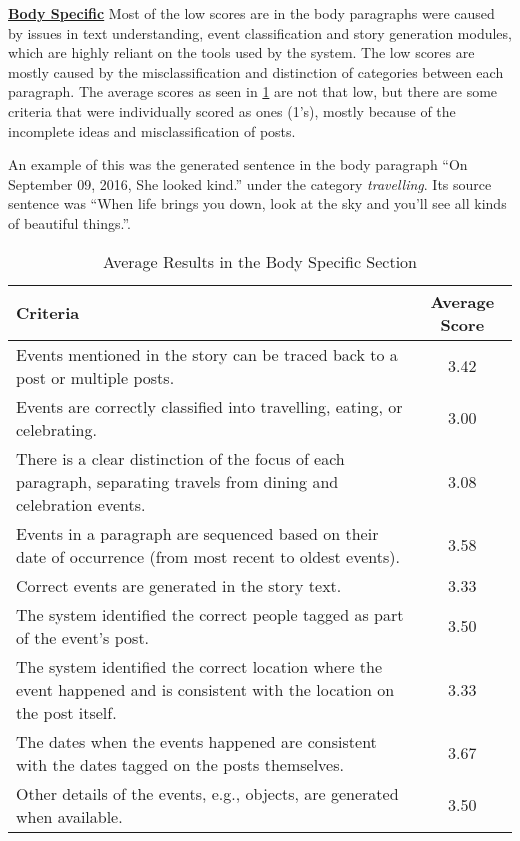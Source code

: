 \clearpage
\underline{\textbf{Body Specific}}
Most of the low scores are in the body paragraphs were caused by issues in text understanding, event classification and story generation modules, which are highly reliant on the tools used by the system. The low scores are mostly caused by the misclassification and distinction of categories between each paragraph. The average scores as seen in \ref{tab:criteria3} are not that low, but there are some criteria that were individually scored as ones (1's), mostly because of the incomplete ideas and misclassification of posts. 

An example of this was the generated sentence in the body paragraph ``On September 09, 2016, She looked kind.'' under the category \textit{travelling}. Its source sentence was ``When life brings you down, look at the sky and you'll see all kinds of beautiful things.''.

\begin{table}[ph!]   %
	\centering
	\caption{Average Results in the Body Specific Section} \vspace{0.25em}
	\begin{tabular}{|p{2.5in}|c|} \hline
		\centering Criteria & Average Score \\ \hline
		Events mentioned in the story can be traced back to a post or multiple posts. & 3.42 \\ \hline
		Events are correctly classified into travelling, eating, or celebrating. & 3.00 \\ \hline
		There is a clear distinction of the focus of each paragraph, separating travels from dining and celebration events. & 3.08 \\ \hline
		Events in a paragraph are sequenced based on their date of occurrence (from most recent to oldest events). & 3.58 \\ \hline
		Correct events are generated in the story text. & 3.33 \\ \hline
		The system identified the correct people tagged as part of the event’s post. & 3.50 \\ \hline
		The system identified the correct location where the event happened and is consistent with the location on the post itself. & 3.33 \\ \hline
		The dates when the events happened are consistent with the dates tagged on the posts themselves. & 3.67 \\ \hline
		Other details of the events, e.g., objects, are generated when available. & 3.50 \\ \hline
	\end{tabular}
	\label{tab:criteria3}
\end{table}

